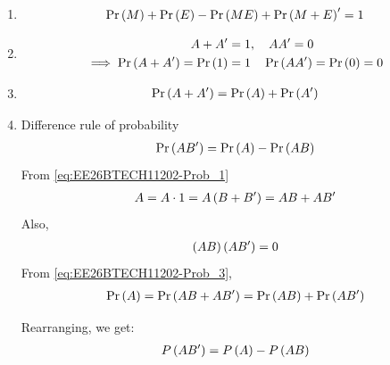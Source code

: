 \begin{enumerate}[label=\thesubsection.\arabic*, ref=\thesubsection.\theenumi]
\item 
\begin{align}
\Pr\left(M\right) + \Pr\left(E\right) - \Pr\left(ME\right) + \Pr\left(M + E\right)^{\prime} = 1 \label{eq:EE26BTECH11202-addition_theorem_probability}
\end{align}
\item 
\begin{align}
	A + A^{\prime} &= 1, \quad AA^{\prime} = 0 \label{eq:EE26BTECH11202-Prob_1}
	\\
	\implies \Pr\left(A + A^{\prime}\right) = \Pr\left(1\right)&= 1  \quad \Pr\left(AA^{\prime}\right) =\Pr\left(0\right)= 0
\label{eq:EE26BTECH11202-Prob_2}
\end{align}
\item 
\begin{align}
	\Pr\left(A + A^{\prime}\right) = \Pr\left(A\right) + \Pr\left(A^{\prime}\right) 
	\label{eq:EE26BTECH11202-Prob_3}
\end{align}
\item Difference rule of probability
	\begin{align}
{\ensuremath{\Pr\left(AB^{\prime}\right)} = \ensuremath{\Pr\left(A\right)} - \ensuremath{\Pr\left(AB\right)}}
	\end{align}
\solution
From \eqref{eq:EE26BTECH11202-Prob_1}
\begin{align}
A = A \cdot 1 = A\left(B + B^{\prime}\right)
 = AB + AB^{\prime}
\end{align}
Also, 
\begin{align}
\left(AB\right)\left(AB^{\prime}\right) = 0
\end{align}
From \eqref{eq:EE26BTECH11202-Prob_3},
\begin{align}
\Pr\left(A\right) = \Pr\left(AB + AB^{\prime}\right) = \Pr\left(AB\right) + \Pr\left(AB^{\prime}\right)
\end{align}

Rearranging, we get:
\begin{align}
{P\ensuremath{\left(AB^{\prime}\right)} = P\ensuremath{\left(A\right)} - P\ensuremath{\left(AB\right)}}
\end{align}


\end{enumerate}
